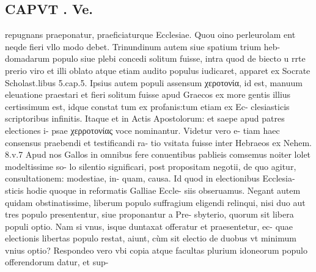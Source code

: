 \documentclass{article}
\begin{document}
\begin{pages}
\section*{CAPVT . Ve. }
\marginpar{[ p.355 ]}\pstart repugnans praeponatur, praeficiaturque Ecclesiae. Quou oino perleurolam ent neqde fieri vllo modo debet.  \pend\pstart Trinundinum autem siue spatium trium heb- domadarum populo siue plebi concedi solitum fuisse, intra quod de biecto u rrte prerio viro et illi oblato atque etiam audito populus iudicaret, apparet ex Socrate Scholast.libus  5.cap.5.  \pend\pstart Ipsius autem populi assensum χεροτονία, id est, manuum eleuatione praestari et fieri solitum fuisse apud Graecos ex more gentis illius certissimum est, idque constat tum ex profanis:tum etiam ex Ec- clesiasticis scriptoribus infinitis. Itaque  et in Actis Apostolorum: et saepe apud patres electiones i- psae χερροτονίας voce nominantur. Videtur vero e- tiam haec consensus praebendi et testificandi ra- tio vsitata fuisse inter Hebraeos ex Nehem. 8.v.7 Apud nos Gallos in omnibus fere conuentibus pablieis comsemus noiter lolet modeltissime so- lo silentio significari, post propositam negotii, de quo agitur, consultationem: modestiae, in- quam, causa. Id quod in electionibus Ecclesia- sticis hodie quoque in reformatis Galliae Eccle- siis obseruamus.  \pend\pstart Negant autem quidam obstinatissime, liberum populo suffragium eligendi relinqui, nisi duo aut tres populo presententur, siue proponantur a Pre- sbyterio, quorum sit libera populi optio. Nam si vnus, isque duntaxat offeratur et praesentetur, ec- quae electionis libertas populo restat, aiunt, cùm sit electio de duobus vt minimum vnius optio? Respondeo vero vbi copia atque facultas plurium idoneorum populo offerendorum datur, et sup-  \pend

\end{pages}
\end{document}

